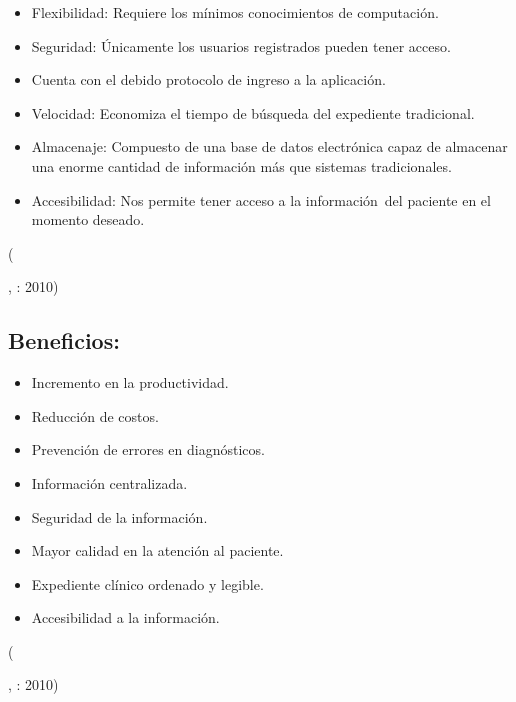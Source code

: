 \begin{center}
  \begin{minipage}{0.9\linewidth}
    \vspace{5pt}%
    {\small
    \begin{itemize}
      \item Flexibilidad: Requiere los mínimos conocimientos de computación.
      \item Seguridad: Únicamente los usuarios registrados pueden tener acceso. 
      \item Cuenta con el debido protocolo de ingreso a la aplicación.
      \item Velocidad: Economiza el tiempo de búsqueda del expediente tradicional.
      \item Almacenaje: Compuesto de una base de datos electrónica capaz de almacenar una enorme cantidad de información más que sistemas tradicionales.
      \item Accesibilidad: Nos permite tener acceso a la información del paciente en el momento deseado.
    \end{itemize}
    }
    \begin{flushright}
      (\author{Elex},
      : 2010)
    \end{flushright}
      \vspace{5pt}%
  \end{minipage}
\end{center}


\subsection{Beneficios:}

\begin{center}
  \begin{minipage}{0.9\linewidth}
    \vspace{5pt}%
    {\small
    \begin{itemize}
      \item Incremento en la productividad.
      \item Reducción de costos.
      \item Prevención de errores en diagnósticos.
      \item Información centralizada.
      \item Seguridad de la información.
      \item Mayor calidad en la atención al paciente.
      \item Expediente clínico ordenado y legible.
      \item Accesibilidad a la información.
    \end{itemize}
    }
    \begin{flushright}
      (\author{Elex},
      : 2010)
    \end{flushright}
      \vspace{5pt}%
  \end{minipage}
\end{center}



